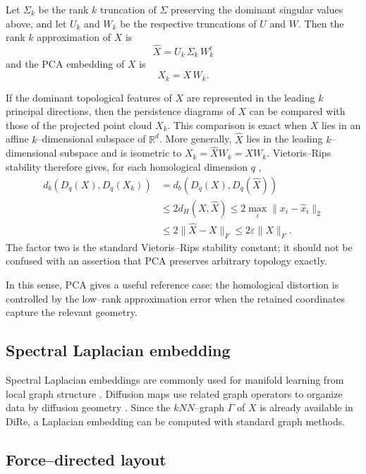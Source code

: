 \documentclass[11pt]{article}
\begin{document}
Let $\Sigma_k$ be the rank $k$ truncation of $\Sigma$ preserving the dominant singular values above, and let $U_k$ and $W_k$ be the respective truncations of $U$ and $W$. Then the rank $k$ approximation of $X$ is
\[\widehat{X} =  U_k\, \Sigma_k\, W^t_k \]
and the PCA embedding of $X$ is
\[ X_k = X\, W_k. \]

If the dominant topological features of $X$ are represented in the leading
$k$ principal directions, then the persistence diagrams of $X$ can be
compared with those of the projected point cloud $X_k$. This comparison is
exact when $X$ lies in an affine $k$--dimensional subspace of
$\mathbb{R}^d$. More generally, $\widehat X$ lies in the leading
$k$--dimensional subspace and is isometric to $X_k=\widehat XW_k=XW_k$.
Vietoris--Rips stability therefore gives, for each homological dimension $q$
\cite{chazal-persistence},
\[
\begin{aligned}
d_b\!\left(D_q(X),D_q(X_k)\right)
&=d_b\!\left(D_q(X),D_q(\widehat X)\right)\\
&\leq 2d_H(X,\widehat X)
\leq 2\max_i\|x_i-\widehat x_i\|_2\\
&\leq 2\|\widehat X-X\|_F
\leq2\varepsilon\|X\|_F .
\end{aligned}
\]
The factor two is the standard Vietoris--Rips stability constant; it should
not be confused with an assertion that PCA preserves arbitrary topology
exactly.

In this sense, PCA gives a useful reference case: the homological distortion is controlled by the low--rank approximation error when the retained coordinates capture the relevant geometry.

\subsection{Spectral Laplacian embedding}

Spectral Laplacian embeddings are commonly used for manifold learning from local graph structure \cite{tenenbaum-isomap,belkin-niyogi-laplacian}. Diffusion maps use related graph operators to organize data by diffusion geometry \cite{coifman-lafon-diffusion}. Since the $kNN$--graph $\Gamma$ of $X$ is already available in DiRe, a Laplacian embedding can be computed with standard graph methods.

\subsection{Force--directed layout}
\end{document}
